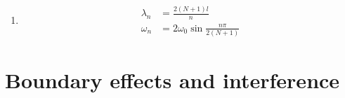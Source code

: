 \documentclass{article}
\begin{document}
\begin{enumerate}
  \item

        \begin{align*}
          \lambda_n & = \frac{2 (N + 1) l}{n}                   \\
          \omega_n  & = 2 \omega_0 \sin \frac{n \pi}{2 (N + 1)}
        \end{align*}
\end{enumerate}

\section{Boundary effects and interference}

\subsection{}
\end{document}
